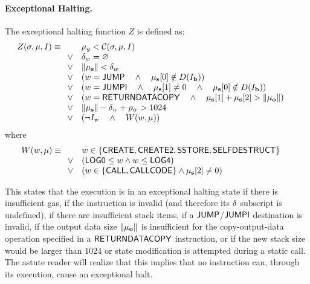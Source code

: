 \paragraph{Exceptional Halting.}\hypertarget{Exceptional_Halting_function_Z}{}
%
The exceptional halting function $Z$ is defined as:
\begin{equation}
	Z(\mathbf{\sigma}, \mathbf{\mu}, I) \equiv
	\begin{array}[t]{ll}
		& \mathbf{\mu}_g < \mathcal{C}(\mathbf{\sigma}, \mathbf{\mu}, I) \quad \\
		\vee & \mathbf{\delta}_w = \varnothing \quad \\
		\vee & \lVert\mathbf{\mu}_\mathbf{s}\rVert < \mathbf{\delta}_w \quad \\
		\vee & \left( w =  \mathsf{JUMP} \quad \wedge \quad \mathbf{\mu}_\mathbf{s}[0] \notin D(I_\mathbf{b})  \right) \quad \\
		\vee & \left( w =  \mathsf{JUMPI} \quad \wedge \quad \mathbf{\mu}_\mathbf{s}[1] \neq 0 \quad \wedge \quad \mathbf{\mu}_\mathbf{s}[0] \notin D(I_\mathbf{b})  \right) \quad \\
		\vee & \left( w = \mathsf{RETURNDATACOPY} \quad \wedge \quad \mathbf{\mu}_{\mathbf{s}}[1] + \mathbf{\mu}_{\mathbf{s}}[2] > \lVert\mathbf{\mu}_{\mathbf{o}}\rVert \right) \quad \\
		\vee & \lVert\mathbf{\mu}_\mathbf{s}\rVert - \mathbf{\delta}_w + \mathbf{\rho}_w > 1024 \quad\\ 
		\vee & \left(\neg I_{\mathrm{w}} \quad \wedge \quad W(w, \mathbf{\mu})\right)
	\end{array}
\end{equation}
where
\begin{equation}
W(w, \mathbf{\mu}) \equiv \\
\begin{array}[t]{ll}
	& w \in \{ \mathsf{CREATE},  \mathsf{CREATE2},  \mathsf{SSTORE}, \mathsf{SELFDESTRUCT}\} \quad \\
	\vee & \left(\mathsf{LOG0} \le w \wedge w \le  \mathsf{LOG4} \right)\\
	\vee & \left(w \in \{ \mathsf{CALL},  \mathsf{CALLCODE}\} \wedge \mathbf{\mu}_{\mathbf{s}}[2] \neq 0\right)
\end{array}
\end{equation}

This states that the execution is in an exceptional halting state if there is insufficient gas, if the instruction is invalid (and therefore its $\mathbf{\delta}$ subscript is undefined), if there are insufficient stack items, if a $\mathsf{JUMP}$/$\mathsf{JUMPI}$ destination is invalid, 
if the output data size $\lVert\mathbf{\mu}_{\mathbf{o}}\rVert$ is insufficient for the copy-output-data operation specified in a $\mathsf{RETURNDATACOPY}$ instruction,
or if the new stack size would be larger than $1024$ or state modification is attempted during a static call. The astute reader will realize that this implies that no instruction can, through its execution, cause an exceptional halt.

